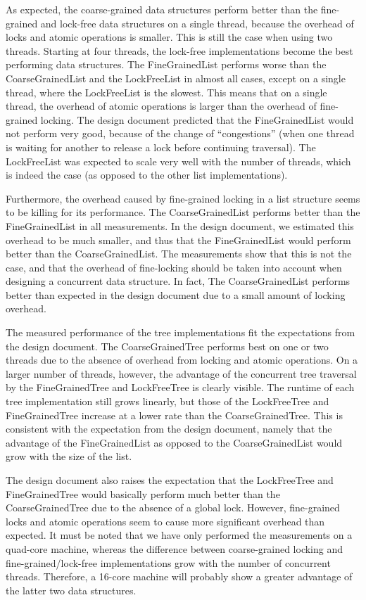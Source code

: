 \documentclass[a4paper]{article}
\begin{document}
As expected, the coarse-grained data structures perform better than the
fine-grained and lock-free data structures on a single thread, because the
overhead of locks and atomic operations is smaller. This is still the case when
using two threads. Starting at four threads, the lock-free implementations
become the best performing data structures. The FineGrainedList performs worse
than the CoarseGrainedList and the LockFreeList in almost all cases, except on
a single thread, where the LockFreeList is the slowest. This means that on a
single thread, the overhead of atomic operations is larger than the overhead of
fine-grained locking. The design document predicted that the FineGrainedList
would not perform very good, because of the change of ``congestions'' (when one
thread is waiting for another to release a lock before continuing traversal).
The LockFreeList was expected to scale very well with the number of threads,
which is indeed the case (as opposed to the other list implementations).

Furthermore, the overhead caused by fine-grained locking in a list structure
seems to be killing for its performance. The CoarseGrainedList performs better
than the FineGrainedList in all measurements.  In the design document, we
estimated this overhead to be much smaller, and thus that the FineGrainedList
would perform better than the CoarseGrainedList. The measurements show that
this is not the case, and that the overhead of fine-locking should be taken
into account when designing a concurrent data structure. In fact, The
CoarseGrainedList performs better than expected in the design document due to
a small amount of locking overhead.

The measured performance of the tree implementations fit the expectations from
the design document. The CoarseGrainedTree performs best on one or two threads
due to the absence of overhead from locking and atomic operations. On a larger
number of threads, however, the advantage of the concurrent tree traversal by
the FineGrainedTree and LockFreeTree is clearly visible. The runtime of each
tree implementation still grows linearly, but those of the LockFreeTree and
FineGrainedTree increase at a lower rate than the CoarseGrainedTree. This is
consistent with the expectation from the design document, namely that the
advantage of the FineGrainedList as opposed to the CoarseGrainedList would grow
with the size of the list.

The design document also raises the expectation that the LockFreeTree and
FineGrainedTree would basically perform much better than the CoarseGrainedTree
due to the absence of a global lock. However, fine-grained locks and atomic
operations seem to cause more significant overhead than expected. It must be
noted that we have only performed the measurements on a quad-core machine,
whereas the difference between coarse-grained locking and
fine-grained/lock-free implementations grow with the number of concurrent
threads. Therefore, a 16-core machine will probably show a greater advantage of
the latter two data structures.
\end{document}
